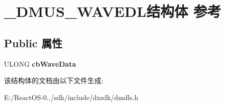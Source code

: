 \hypertarget{struct___d_m_u_s___w_a_v_e_d_l}{}\section{\+\_\+\+D\+M\+U\+S\+\_\+\+W\+A\+V\+E\+D\+L结构体 参考}
\label{struct___d_m_u_s___w_a_v_e_d_l}
\subsection*{Public 属性}
\begin{DoxyCompactItemize}
\item 
\mbox{\label{struct___d_m_u_s___w_a_v_e_d_l_a76da4bfd28a3f4b4de673d4f1379fc90}} 
U\+L\+O\+NG {\bfseries cb\+Wave\+Data}
\end{DoxyCompactItemize}


该结构体的文档由以下文件生成\+:\begin{DoxyCompactItemize}
\item 
E\+:/\+React\+O\+S-\/0../sdk/include/dxsdk/dmdls.\+h\end{DoxyCompactItemize}
